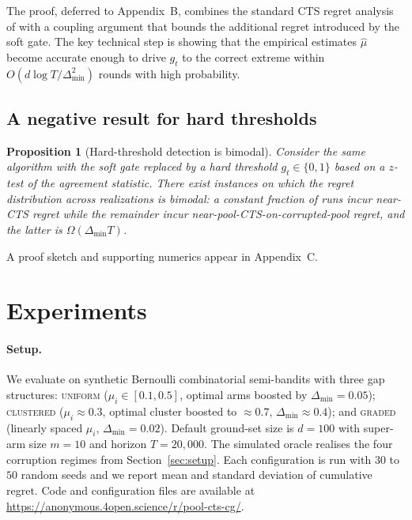 \documentclass{article}
\theoremstyle{plain}
\newtheorem{proposition}{Proposition}
\theoremstyle{definition}
\theoremstyle{remark}
\newcommand{\gap}{\Delta_{\min}}
\begin{document}
The proof, deferred to Appendix~B, combines the standard CTS regret analysis of \citet{wang2018cts} with a coupling argument that bounds the additional regret introduced by the soft gate. The key technical step is showing that the empirical estimates $\hat{\mu}$ become accurate enough to drive $g_t$ to the correct extreme within $O(d \log T / \gap^2)$ rounds with high probability.

\subsection{A negative result for hard thresholds}

\begin{proposition}[Hard-threshold detection is bimodal]
\label{prop:bimodal}
Consider the same algorithm with the soft gate replaced by a hard threshold $g_t \in \{0,1\}$ based on a $z$-test of the agreement statistic. There exist instances on which the regret distribution across realizations is bimodal: a constant fraction of runs incur near-CTS regret while the remainder incur near-pool-CTS-on-corrupted-pool regret, and the latter is $\Omega(\gap T)$.
\end{proposition}

A proof sketch and supporting numerics appear in Appendix~C.

\section{Experiments}
\label{sec:experiments}

\paragraph{Setup.} We evaluate on synthetic Bernoulli combinatorial semi-bandits with three gap structures: \textsc{uniform} ($\mu_i \in [0.1, 0.5]$, optimal arms boosted by $\gap = 0.05$); \textsc{clustered} ($\mu_i \approx 0.3$, optimal cluster boosted to $\approx 0.7$, $\gap \approx 0.4$); and \textsc{graded} (linearly spaced $\mu_i$, $\gap = 0.02$). Default ground-set size is $d = 100$ with super-arm size $m = 10$ and horizon $T = 20{,}000$. The simulated oracle realises the four corruption regimes from Section~\ref{sec:setup}. Each configuration is run with $30$ to $50$ random seeds and we report mean and standard deviation of cumulative regret. Code and configuration files are available at \url{https://anonymous.4open.science/r/pool-cts-cg/}.
\end{document}
